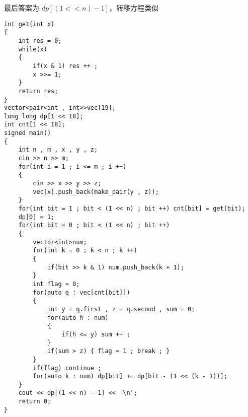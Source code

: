 \documentclass[E:/GsjzTle/main/main.tex]{subfiles}
\begin{document}
最后答案为 \(dp[(1 << n) - 1]\)，转移方程类似

\begin{lstlisting}
int get(int x)
{
	int res = 0;
	while(x)
	{
		if(x & 1) res ++ ;	
		x >>= 1;
	}
	return res;
}
vector<pair<int , int>>vec[19];
long long dp[1 << 18];
int cnt[1 << 18];
signed main()
{
	int n , m , x , y , z;
	cin >> n >> m;
	for(int i = 1 ; i <= m ; i ++)
	{
		cin >> x >> y >> z;
		vec[x].push_back(make_pair(y , z));
	}
	for(int bit = 1 ; bit < (1 << n) ; bit ++) cnt[bit] = get(bit);
	dp[0] = 1;
	for(int bit = 0 ; bit < (1 << n) ; bit ++)
	{
		vector<int>num;	
		for(int k = 0 ; k < n ; k ++)
		{
			if(bit >> k & 1) num.push_back(k + 1);
		}
		int flag = 0;
		for(auto q : vec[cnt[bit]])
		{
			int y = q.first , z = q.second , sum = 0;
			for(auto h : num)
			{
				if(h <= y) sum ++ ;
			}	
			if(sum > z) { flag = 1 ; break ; }
		}	
		if(flag) continue ;	
		for(auto k : num) dp[bit] += dp[bit - (1 << (k - 1))];
	} 
	cout << dp[(1 << n) - 1] << '\n';
	return 0;
}
\end{lstlisting}
\end{document}
